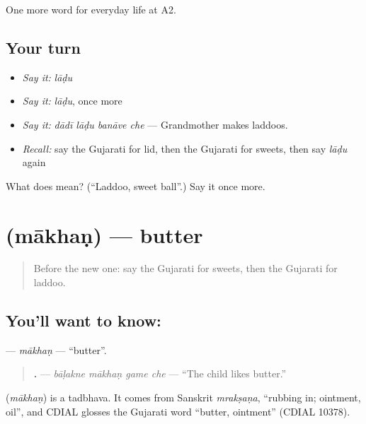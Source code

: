\begin{grammarlens}[title={What you've built}]
One more word for everyday life at A2.
\end{grammarlens}

\subsection*{Your turn}
\begin{itemize}
\raggedright
  \item \emph{Say it:} \emph{lāḍu}
  \item \emph{Say it:} \emph{lāḍu}, once more
  \item \emph{Say it:} \emph{dādī lāḍu banāve che} — Grandmother makes laddoos.
  \item \emph{Recall:} say the Gujarati for lid, then the Gujarati for sweets, then say \emph{lāḍu} again
\end{itemize}

\begin{tcolorbox}[breakable,colback=teal!4,colframe=teal!35!black,title={Before you move on}]
What does  mean? (\textquotedblleft{}Laddoo, sweet ball\textquotedblright{}.) Say it once more.
\end{tcolorbox}
\section[\texorpdfstring{\gu{માખણ} (mākhaṇ)}{માખણ (mākhaṇ)}]{ (mākhaṇ) — butter}

\label{lesson:GU-C170-makhan}



\begin{quote}
Before the new one: say the Gujarati for sweets, then the Gujarati for laddoo.
\end{quote}

\subsection*{You'll want to know: }
\textbf{} — \emph{mākhaṇ} — \textquotedblleft{}butter\textquotedblright{}.

\begin{quote}
\textbf{   .} — \emph{bāḷakne mākhaṇ game che} — \textquotedblleft{}The child likes butter.\textquotedblright{}
\end{quote}

\begin{cousinweb}
\textbf{} (\emph{mākhaṇ}) is a tadbhava. It comes from Sanskrit \emph{mrakṣaṇa}, \textquotedblleft{}rubbing in; ointment, oil\textquotedblright{}, and CDIAL glosses the Gujarati word \textquotedblleft{}butter, ointment\textquotedblright{} (CDIAL 10378).
\end{cousinweb}

